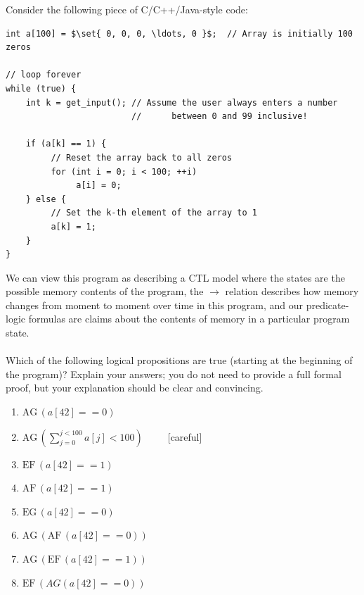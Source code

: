 \documentclass[12pt,letterpaper,boxed,cm]{hmcpset}
\newcommand{\pn}[1]{\left( #1 \right)}
\newcommand{\bk}[1]{\left[ #1 \right]}
\newcommand{\set}[1]{\left\{#1\right\}}
\newcommand{\ra}[0]{\rightarrow}
\newcommand{\EF}[0]{\text{EF}\,}
\newcommand{\AF}[0]{\text{AF}\,}
\newcommand{\EG}[0]{\text{EG}\,}
\newcommand{\AG}[0]{\text{AG}\,}
\begin{document}
\begin{solution}
    \vfill
\end{solution}
\newpage

\begin{problem}[2.]
    [24 points] Consider the following piece of C/C++/Java-style code:
    \begin{lstlisting}[mathescape]
int a[100] = $\set{ 0, 0, 0, \ldots, 0 }$;  // Array is initially 100 zeros

// loop forever
while (true) {
    int k = get_input(); // Assume the user always enters a number
                         //      between 0 and 99 inclusive!

    if (a[k] == 1) {
         // Reset the array back to all zeros
         for (int i = 0; i < 100; ++i)
              a[i] = 0;
    } else {
         // Set the k-th element of the array to 1
         a[k] = 1;
    }
}
    \end{lstlisting}
    We can view this program as describing a CTL model where the states are the possible memory contents of the program, the $\ra$ relation describes how memory changes from moment to moment over time in this program, and our predicate-logic formulas are claims about the contents of memory in a particular program state.\\\\
    Which of the following logical propositions are true (starting at the beginning of the program)?  Explain your answers; you do not need to provide a full formal proof, but your explanation should be clear and convincing.
    \begin{enumerate}[label=\Alph*.]
        \item $\AG  (a[42] == 0)$
        \item $\displaystyle \AG\pn{\sum_{j=0}^{j<100}a\bk{j}<100}$~~~~~[careful]
        \item $\EF  (a[42] == 1)$
        \item $\AF  (a[42] == 1)$
        \item $\EG  (a[42] == 0)$
        \item $\AG  (\AF  (a[42] == 0))$
        \item $\AG  (\EF  (a[42] == 1))$
        \item $\EF  (AG  (a[42] == 0))$
    \end{enumerate}
\end{problem}
\end{document}
